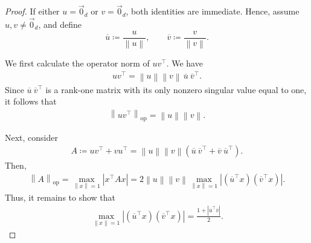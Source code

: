 \documentclass[11pt]{article}
\theoremstyle{definition}
\theoremstyle{plain}
\newcommand{\abs}[1]{\left| #1 \right|}
\newcommand{\Norm}[1]{\left\| #1 \right\|}
\providecommand{\norm}[1]{\Norm{#1}}
\begin{document}
\begin{proof}
    If either $u=\vec{0}_d$ or $v=\vec{0}_d$, both identities are immediate. Hence, assume
    $u,v\neq \vec{0}_d$, and define
    \[
        \overline{u}\coloneq \frac{u}{\norm{u}},
        \qquad
        \overline{v}\coloneq \frac{v}{\norm{v}}.
    \]

    We first calculate the operator norm of $uv^{\top}$. We have
    \begin{align}
        uv^{\top}
        =
        \norm{u}\norm{v}\,
        \overline{u}\ \overline{v}^{\top}.
    \end{align}
    Since $\overline{u}\ \overline{v}^{\top}$ is a rank-one matrix with its only
    nonzero singular value equal to one, it follows that
    \begin{align}
        \norm{uv^{\top}}_{\mathrm{op}}
        =
        \norm{u}\norm{v}.
    \end{align}

    Next, consider
    \begin{align}
        A
        \coloneq
        uv^{\top}+vu^{\top}
        =
        \norm{u}\norm{v}
        \left(
        \overline{u}\ \overline{v}^{\top}
        +
        \overline{v}\ \overline{u}^{\top}
        \right).
    \end{align}
    Then, 
    \begin{align}
        \norm{A}_{\mathrm{op}} = \max_{\norm{x}=1}\abs{x^{\top}Ax} = 2\norm{u}\norm{v}\max_{\norm{x}=1}\abs{(\overline{u}^{\top}x)(\overline{v}^{\top}x)}.
    \end{align}
    Thus, it remains to show that
    \begin{align}
        \max_{\norm{x}=1}
        \abs{
        (\overline{u}^{\top}x)(\overline{v}^{\top}x)
        }
        =
        \frac{1+\abs{\overline{u}^{\top}\overline{v}}}{2}.
    \end{align}


\end{proof}
\end{document}
